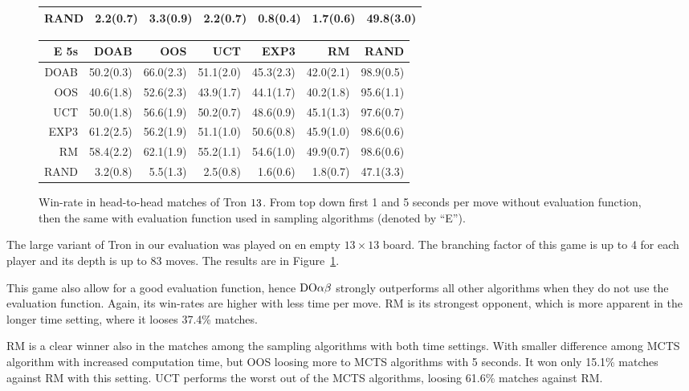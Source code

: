 \begin{figure}[t!]
\begin{scriptsize}
\begin{tabular}{|r|rrrrrr|}
RAND&2.2(0.7)&3.3(0.9)&2.2(0.7)&0.8(0.4)&1.7(0.6)&49.8(3.0)\\
\hline
\end{tabular}
\begin{tabular}{|r|rrrrrr|}\hline
E 5s&DOAB&OOS&UCT&EXP3&RM&RAND\\\hline
DOAB&50.2(0.3)&66.0(2.3)&51.1(2.0)&45.3(2.3)&42.0(2.1)&98.9(0.5)\\
OOS&40.6(1.8)&52.6(2.3)&43.9(1.7)&44.1(1.7)&40.2(1.8)&95.6(1.1)\\
UCT&50.0(1.8)&56.6(1.9)&50.2(0.7)&48.6(0.9)&45.1(1.3)&97.6(0.7)\\
EXP3&61.2(2.5)&56.2(1.9)&51.1(1.0)&50.6(0.8)&45.9(1.0)&98.6(0.6)\\
RM&58.4(2.2)&62.1(1.9)&55.2(1.1)&54.6(1.0)&49.9(0.7)&98.6(0.6)\\
RAND&3.2(0.8)&5.5(1.3)&2.5(0.8)&1.6(0.6)&1.8(0.7)&47.1(3.3)\\
\hline
\end{tabular}

\end{scriptsize}
\caption{Win-rate in head-to-head matches of Tron $13\time 13$. From top down first 1 and 5 seconds per move without evaluation function, then the same with evaluation function used in sampling algorithms (denoted by ``E'').}\label{fig:matches:tron}
\end{figure}

The large variant of Tron in our evaluation was played on en empty $13\times 13$ board. The branching factor of this game is up to 4 for each player and its depth is up to 83 moves. The results are in Figure~\ref{fig:matches:tron}.

This game also allow for a good evaluation function, hence $\textrm{DO}\alpha\beta$ strongly  outperforms all other algorithms when they do not use the evaluation function. Again, its win-rates are higher with less time per move. RM is its strongest opponent, which is more apparent in the longer time setting, where it looses 37.4\% matches.

RM is a clear winner also in the matches among the sampling algorithms with both time settings. With smaller difference among MCTS algorithm with increased computation time, but OOS loosing more to MCTS algorithms with 5 seconds. It won only 15.1\% matches against RM with this setting. UCT performs the worst out of the MCTS algorithms, loosing 61.6\% matches against RM.

